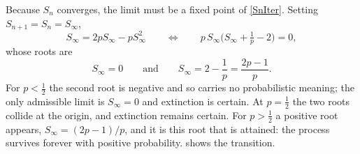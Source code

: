 Because $S_n$ converges, the limit must be a fixed point of \cref{SnIter}. Setting
$S_{n+1}=S_n=S_\infty$,
\begin{equation*}
S_\infty = 2p S_\infty - p S_\infty^2
\qquad\Longleftrightarrow\qquad
p\,S_\infty\bigl(S_\infty + \tfrac1p - 2\bigr) = 0,
\end{equation*}
whose roots are
\begin{equation*}
S_\infty = 0
\qquad\text{and}\qquad
S_\infty = 2 - \frac1p = \frac{2p-1}{p}.
\end{equation*}
For $p<\tfrac12$ the second root is negative and so carries no probabilistic meaning;
the only admissible limit is $S_\infty=0$ and extinction is certain. At $p=\tfrac12$ the
two roots collide at the origin, and extinction remains certain. For $p>\tfrac12$ a
positive root appears, $S_\infty = (2p-1)/p$, and it is this root that is attained: the
process survives forever with positive probability.  shows
the transition.

